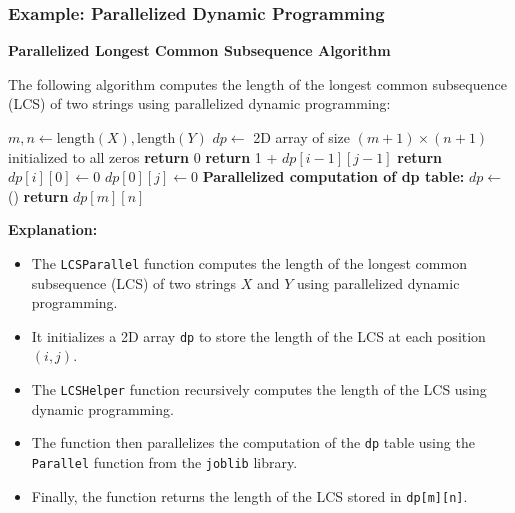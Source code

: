\documentclass[12pt]{book} %
\begin{document}
\subsubsection{Example: Parallelized Dynamic Programming}

\textbf{Parallelized Longest Common Subsequence Algorithm}

The following algorithm computes the length of the longest common subsequence (LCS) of two strings using parallelized dynamic programming:
\FloatBarrier
\begin{algorithm}
\caption{Parallelized LCS Algorithm}\label{parallel-lcs}
\begin{algorithmic}[1]
    \State $m, n \gets \text{length}(X), \text{length}(Y)$
    \State $dp \gets$ 2D array of size $(m+1) \times (n+1)$ initialized to all zeros
            \State \textbf{return} 0
            \State \textbf{return} 1 + $dp[i - 1][j - 1]$
        \Else
            \State \textbf{return} 
        \EndIf
    \EndFunction
        \State $dp[i][0] \gets 0$
    \EndFor
        \State $dp[0][j] \gets 0$
    \EndFor
    \State \textbf{Parallelized computation of dp table:}
    \State $dp \gets$ ()
    \State \textbf{return} $dp[m][n]$
\EndFunction
\end{algorithmic}
\end{algorithm}
\FloatBarrier
\textbf{Explanation:}
\begin{itemize}
    \item The \texttt{LCSParallel} function computes the length of the longest common subsequence (LCS) of two strings $X$ and $Y$ using parallelized dynamic programming.
    \item It initializes a 2D array \texttt{dp} to store the length of the LCS at each position $(i, j)$.
    \item The \texttt{LCSHelper} function recursively computes the length of the LCS using dynamic programming.
    \item The function then parallelizes the computation of the \texttt{dp} table using the \texttt{Parallel} function from the \texttt{joblib} library.
    \item Finally, the function returns the length of the LCS stored in \texttt{dp[m][n]}.
\end{itemize}
\end{document}
